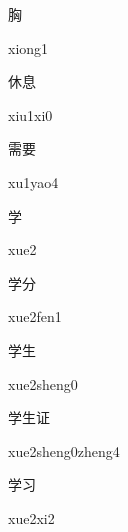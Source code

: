 \begin{multicols*}{2}
\begin{verbete}[xiong1]{胸}
\begin{pronuncia}{xiong1}
\end{pronuncia}
\end{verbete}

\begin{verbete}[xiu1xi0]{休息}
\begin{pronuncia}{xiu1xi0}
\end{pronuncia}
\end{verbete}

\begin{verbete}[xu1yao4]{需要}
\begin{pronuncia}{xu1yao4}
\end{pronuncia}
\end{verbete}

\begin{verbete}[xue2]{学}
\begin{pronuncia}{xue2}
\end{pronuncia}
\end{verbete}

\begin{verbete}{学分}
\begin{pronuncia}{xue2fen1}
\end{pronuncia}
\end{verbete}

\begin{verbete}{学生}
\begin{pronuncia}{xue2sheng0}
\end{pronuncia}
\end{verbete}

\begin{verbete}{学生证}
\begin{pronuncia}{xue2sheng0zheng4}
\end{pronuncia}
\end{verbete}

\begin{verbete}[xue2xi2]{学习}
\begin{pronuncia}{xue2xi2}
\end{pronuncia}
\end{verbete}


\end{multicols*}

